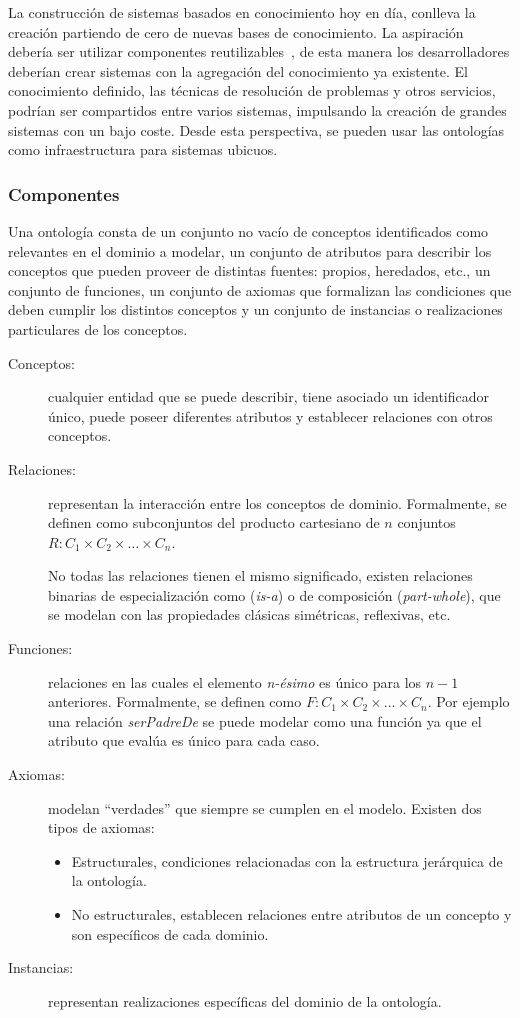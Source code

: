 La construcción de sistemas basados en conocimiento hoy en día, conlleva la
creación partiendo de cero de nuevas bases de conocimiento. La aspiración debería ser
utilizar componentes reutilizables~\cite{Gruber93towards}, de esta manera los desarrolladores deberían
crear sistemas con la agregación del conocimiento ya existente. El conocimiento definido, 
las técnicas de resolución de problemas y otros servicios, podrían ser
compartidos entre varios sistemas, impulsando la creación de grandes sistemas con
un bajo coste. Desde esta perspectiva, se pueden usar las ontologías como
infraestructura para sistemas ubicuos.

\subsubsection{Componentes}
Una ontología consta de un conjunto no vacío de conceptos identificados como
relevantes en el dominio a modelar, un conjunto de atributos para describir los
conceptos que pueden proveer de distintas fuentes: propios, heredados, etc., un
conjunto de funciones, un conjunto de axiomas que formalizan las condiciones que
deben cumplir los distintos conceptos y un conjunto de instancias o
realizaciones particulares de los conceptos.

\begin{description}
\item[Conceptos:] cualquier entidad que se puede describir, tiene asociado un
identificador único, puede poseer diferentes atributos y establecer relaciones
con otros conceptos.
\item[Relaciones:] representan la interacción entre los conceptos de dominio.
Formalmente, se definen como subconjuntos del producto cartesiano de $n$
conjuntos $R: C_1 \times C_2 \times \ldots \times C_n$.

No todas las relaciones tienen el mismo significado, existen relaciones binarias
de especialización como (\textit{is-a}) o de composición (\textit{part-whole}),
que se modelan con las propiedades clásicas simétricas, reflexivas, etc.

\item[Funciones:]relaciones en las cuales el elemento \textit{n-ésimo} es único para
los $n-1$ anteriores. Formalmente, se definen como $F:C_1 \times C_2 \times
\ldots \times C_n$. Por ejemplo una relación \textit{serPadreDe} se puede
modelar como una función ya que el atributo que evalúa es único para cada caso.

\item[Axiomas:] modelan ``verdades'' que siempre se cumplen en el modelo.
Existen dos tipos de axiomas:
\begin{itemize}
  \item Estructurales, condiciones relacionadas con la estructura jerárquica de
  la ontología. 
  \item No estructurales, establecen relaciones entre atributos de un concepto y
  son específicos de cada dominio.
\end{itemize}

\item[Instancias:] representan realizaciones específicas del dominio de la ontología.
\end{description}

